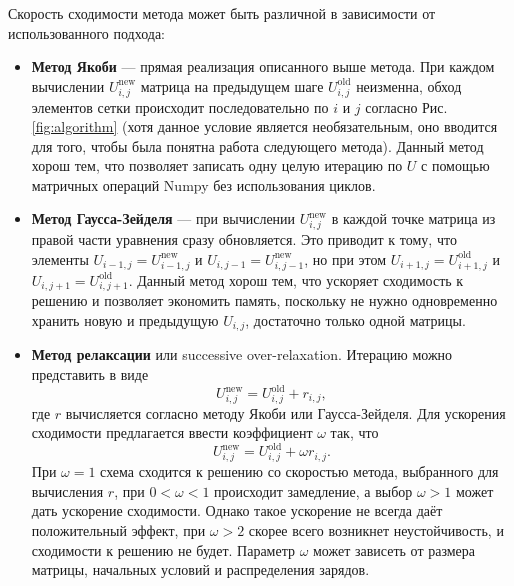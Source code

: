 \documentclass[12pt]{article}
\begin{document}
Скорость сходимости метода может быть различной в зависимости от использованного подхода:
\begin{itemize}
\item \textbf{Метод Якоби} --- прямая реализация описанного выше метода. При каждом вычислении $U^\text{new}_{i,j}$ матрица на предыдущем шаге $U^\text{old}_{i,j}$ неизменна, обход элементов сетки происходит последовательно по $i$ и $j$ согласно Рис. \ref{fig:algorithm} (хотя данное условие является необязательным, оно вводится для того, чтобы была понятна работа следующего метода). Данный метод хорош тем, что позволяет записать одну целую итерацию по $U$ с помощью матричных операций Numpy без использования циклов.

\item \textbf{Метод Гаусса-Зейделя} --- при вычислении $U^\text{new}_{i,j}$ в каждой точке матрица из правой части уравнения сразу обновляется. Это приводит к тому, что элементы $U_{i-1,j}=U^\text{new}_{i-1,j}$ и $U_{i,j-1}=U^\text{new}_{i,j-1}$, но при этом $U_{i+1,j}=U^\text{old}_{i+1,j}$ и $U_{i,j+1}=U^\text{old}_{i,j+1}$. Данный метод хорош тем, что ускоряет сходимость к решению и позволяет экономить память, поскольку не нужно одновременно хранить новую и предыдущую $U_{i,j}$, достаточно только одной матрицы.

\item \textbf{Метод релаксации} или successive over-relaxation. Итерацию можно представить в виде
%
\begin{equation}
U^\text{new}_{i,j}=U^\text{old}_{i,j}+r_{i,j},
\end{equation}
%
где $r$ вычисляется согласно методу Якоби или Гаусса-Зейделя. Для ускорения сходимости предлагается ввести коэффициент $\omega$ так, что
%
\begin{equation}
U^\text{new}_{i,j}=U^\text{old}_{i,j}+\omega r_{i,j}.
\end{equation}
%
При $\omega=1$ схема сходится к решению со скоростью метода, выбранного для вычисления $r$, при $0<\omega<1$ происходит замедление, а выбор $\omega>1$ может дать ускорение сходимости. Однако такое ускорение не всегда даёт положительный эффект, при $\omega>2$ скорее всего возникнет неустойчивость, и сходимости к решению не будет. Параметр $\omega$ может зависеть от размера матрицы, начальных условий и распределения зарядов.
\end{itemize}
\end{document}
